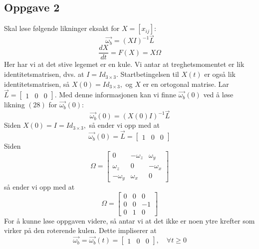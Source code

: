 \subsection{Oppgave 2}
Skal løse følgende likninger eksakt for $X=[x_{ij}]:$
\begin{equation}
    \vec{\omega_b}=(XI)^{-1}\vec{L}
\end{equation}
\begin{equation}
    \frac{dX}{dt}=F(X)=X\Omega
\end{equation}
Her har vi at det stive legemet er en kule. Vi antar at treghetsmomentet er lik identitetsmatrisen, dvs. at $I=Id_{3\times3}.$ Startbetingelsen til $X(t)$ er også lik identitetsmatrisen, så $X(0)=Id_{3\times3},$ og $X$ er en ortogonal matrise. Lar $\vec{L}=\begin{bmatrix}1&0&0\end{bmatrix}.$\newline\newline
Med denne informasjonen kan vi finne $\vec{\omega_b}(0)$ ved å løse likning $(28)$ for $\vec{\omega_b}(0):$
\begin{equation}
    \vec{\omega_b}(0)=(X(0)I)^{-1}\vec{L}
\end{equation}
Siden $X(0)=I=Id_{3\times3},$ så ender vi opp med at
\begin{equation}
    \vec{\omega_b}(0)=\vec{L}=\begin{bmatrix}1&0&0\end{bmatrix}
\end{equation}
Siden
\begin{equation}
    \Omega=\begin{bmatrix}0&-\omega_z&\omega_y\\\omega_z&0&-\omega_x\\-\omega_y&\omega_x&0\end{bmatrix}
\end{equation}
så ender vi opp med at 
\begin{equation}
    \Omega=\begin{bmatrix}0&0&0\\0&0&-1\\0&1&0\end{bmatrix}
\end{equation}
For å kunne løse oppgaven videre, så antar vi at det ikke er noen ytre krefter som virker på den roterende kulen. Dette impliserer at
\begin{equation}
    \vec{\omega_b}=\vec{\omega_b}(t)=\begin{bmatrix}1&0&0\end{bmatrix},\quad\forall t\geq0
\end{equation}

